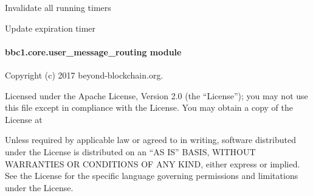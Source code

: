\documentclass[letterpaper,10pt,english]{sphinxmanual}
\begin{document}
\begin{fulllineitems}
\begin{fulllineitems}
\label{\detokenize{bbc1.core.topology_manager:bbc1.core.topology_manager.TopologyManagerBase.stop_all_timers}}
Invalidate all running timers

\end{fulllineitems}


\begin{fulllineitems}
\label{\detokenize{bbc1.core.topology_manager:bbc1.core.topology_manager.TopologyManagerBase.update_refresh_timer_entry}}
Update expiration timer

\end{fulllineitems}


\end{fulllineitems}



\paragraph{bbc1.core.user\_message\_routing module}
\label{\detokenize{bbc1.core.user_message_routing:module-bbc1.core.user_message_routing}}\label{\detokenize{bbc1.core.user_message_routing:bbc1-core-user-message-routing-module}}\label{\detokenize{bbc1.core.user_message_routing::doc}}
Copyright (c) 2017 beyond-blockchain.org.

Licensed under the Apache License, Version 2.0 (the “License”);
you may not use this file except in compliance with the License.
You may obtain a copy of the License at
\begin{quote}

\end{quote}

Unless required by applicable law or agreed to in writing, software
distributed under the License is distributed on an “AS IS” BASIS,
WITHOUT WARRANTIES OR CONDITIONS OF ANY KIND, either express or implied.
See the License for the specific language governing permissions and
limitations under the License.
\end{document}
